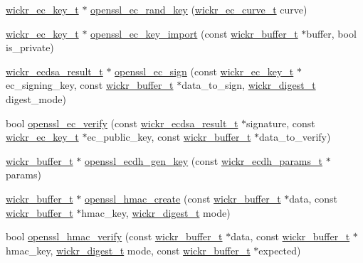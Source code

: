 \begin{DoxyCompactItemize}
\item 
\mbox{\hyperlink{structwickr__ec__key}{wickr\+\_\+ec\+\_\+key\+\_\+t}} $\ast$ \mbox{\hyperlink{group__openssl__crypto_ga75a01a740d558bfcc0f10920266cd9d5}{openssl\+\_\+ec\+\_\+rand\+\_\+key}} (\mbox{\hyperlink{structwickr__ec__curve}{wickr\+\_\+ec\+\_\+curve\+\_\+t}} curve)
\item 
\mbox{\hyperlink{structwickr__ec__key}{wickr\+\_\+ec\+\_\+key\+\_\+t}} $\ast$ \mbox{\hyperlink{group__openssl__crypto_gab2cc137ada900eba89796857603cd8cd}{openssl\+\_\+ec\+\_\+key\+\_\+import}} (const \mbox{\hyperlink{structwickr__buffer}{wickr\+\_\+buffer\+\_\+t}} $\ast$buffer, bool is\+\_\+private)
\item 
\mbox{\hyperlink{structwickr__ecdsa__result}{wickr\+\_\+ecdsa\+\_\+result\+\_\+t}} $\ast$ \mbox{\hyperlink{group__openssl__crypto_gab32cef5c789ee1992afae98a81b65823}{openssl\+\_\+ec\+\_\+sign}} (const \mbox{\hyperlink{structwickr__ec__key}{wickr\+\_\+ec\+\_\+key\+\_\+t}} $\ast$ec\+\_\+signing\+\_\+key, const \mbox{\hyperlink{structwickr__buffer}{wickr\+\_\+buffer\+\_\+t}} $\ast$data\+\_\+to\+\_\+sign, \mbox{\hyperlink{structwickr__digest}{wickr\+\_\+digest\+\_\+t}} digest\+\_\+mode)
\item 
bool \mbox{\hyperlink{group__openssl__crypto_ga1e2b3f17c67e97360b616d0d673767f7}{openssl\+\_\+ec\+\_\+verify}} (const \mbox{\hyperlink{structwickr__ecdsa__result}{wickr\+\_\+ecdsa\+\_\+result\+\_\+t}} $\ast$signature, const \mbox{\hyperlink{structwickr__ec__key}{wickr\+\_\+ec\+\_\+key\+\_\+t}} $\ast$ec\+\_\+public\+\_\+key, const \mbox{\hyperlink{structwickr__buffer}{wickr\+\_\+buffer\+\_\+t}} $\ast$data\+\_\+to\+\_\+verify)
\item 
\mbox{\hyperlink{structwickr__buffer}{wickr\+\_\+buffer\+\_\+t}} $\ast$ \mbox{\hyperlink{group__openssl__crypto_gaa9e626d984efe7fed046d5f62c6c24a4}{openssl\+\_\+ecdh\+\_\+gen\+\_\+key}} (const \mbox{\hyperlink{structwickr__ecdh__params}{wickr\+\_\+ecdh\+\_\+params\+\_\+t}} $\ast$params)
\item 
\mbox{\hyperlink{structwickr__buffer}{wickr\+\_\+buffer\+\_\+t}} $\ast$ \mbox{\hyperlink{group__openssl__crypto_gaeb4574976214a17eb79bbc3d76f573a6}{openssl\+\_\+hmac\+\_\+create}} (const \mbox{\hyperlink{structwickr__buffer}{wickr\+\_\+buffer\+\_\+t}} $\ast$data, const \mbox{\hyperlink{structwickr__buffer}{wickr\+\_\+buffer\+\_\+t}} $\ast$hmac\+\_\+key, \mbox{\hyperlink{structwickr__digest}{wickr\+\_\+digest\+\_\+t}} mode)
\item 
bool \mbox{\hyperlink{group__openssl__crypto_gafbde176ef6f2b99ff9dab58ad69a9a74}{openssl\+\_\+hmac\+\_\+verify}} (const \mbox{\hyperlink{structwickr__buffer}{wickr\+\_\+buffer\+\_\+t}} $\ast$data, const \mbox{\hyperlink{structwickr__buffer}{wickr\+\_\+buffer\+\_\+t}} $\ast$hmac\+\_\+key, \mbox{\hyperlink{structwickr__digest}{wickr\+\_\+digest\+\_\+t}} mode, const \mbox{\hyperlink{structwickr__buffer}{wickr\+\_\+buffer\+\_\+t}} $\ast$expected)

\end{DoxyCompactItemize}
